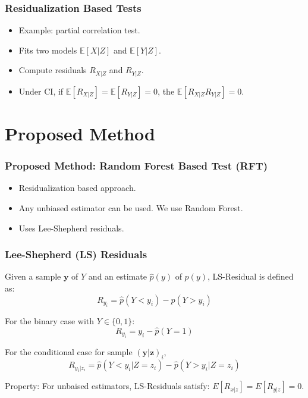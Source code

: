 \documentclass{beamer}
\begin{document}
\begin{frame}
	\frametitle{Residualization Based Tests}
	\begin{itemize}
		\setlength\itemsep{1em}
		\item Example: partial correlation test.
		\item Fits two models $ \mathbb{E}[X | Z] $ and $ \mathbb{E}[Y | Z] $.
		\item Compute residuals $ R_{X|Z} $ and $ R_{Y|Z} $.
		\item Under CI, if $ \mathbb{E}[R_{X|Z}] = \mathbb{E}[R_{Y|Z}] = 0 $, the
			$ \mathbb{E}[R_{X|Z}R_{Y|Z}] = 0 $. \footnotemark
	\end{itemize}
\end{frame}

\section{Proposed Method}
\begin{frame}
	\frametitle{Proposed Method: Random Forest Based Test (RFT)}
	\begin{itemize}
		\setlength\itemsep{1em}
		\item Residualization based approach.
		\item Any unbiased estimator can be used. We use Random Forest.
		\item Uses Lee-Shepherd residuals.
	\end{itemize}
\end{frame}

\begin{frame}
	\frametitle{Lee-Shepherd (LS) Residuals}
	Given a sample $ \bm{y} $ of $ Y $ and an estimate $ \hat{p}(y) $ of $ p(y) $,
	LS-Residual is defined as:
	$$ R_{y_i} = \hat{p}(Y < y_i) - \hat{p}(Y > y_i) $$
	\vspace{1em}

	For the binary case with $ Y \in \{0, 1\} $:
	$$ R_{y_i} = y_i - \hat{p}(Y = 1) $$
	\vspace{1em}

	For the conditional case for sample $ (\bm{y}|\bm{z})_i $,
	$$ R_{y_i | z_i} = \hat{p}(Y < y_i | Z=z_i) - \hat{p}(Y>y_i|Z=z_i) $$

	Property: For unbaised estimators, LS-Residuals satisfy: $ E[R_{x|z}] =
		E[R_{y|z}] = 0 $.
\end{frame}
\end{document}
